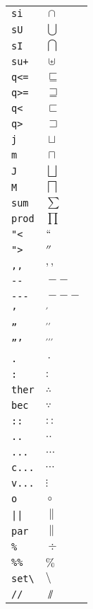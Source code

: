\begin{longtable}{ll}
\texttt{si}&${}\cap {}$\\
\texttt{sU}&${}\bigcup {}$\\
\texttt{sI}&${}\bigcap {}$\\
\texttt{su+}&${}\uplus {}$\\
\texttt{q<=}&${}\sqsubseteq {}$\\
\texttt{q>=}&${}\sqsupseteq {}$\\
\texttt{q<}&${}\sqsubset {}$\\
\texttt{q>}&${}\sqsupset {}$\\
\texttt{j}&${}\sqcup {}$\\
\texttt{m}&${}\sqcap {}$\\
\texttt{J}&${}\bigsqcup {}$\\
\texttt{M}&${}\bigsqcap {}$\\
\texttt{sum}&${}\sum {}$\\
\texttt{prod}&${}\prod {}$\\
\texttt{"<}&${}``{}$\\
\texttt{">}&${}''{}$\\
\texttt{,,}&${},\!\!, {}$\\
\texttt{{-}{-}}&${}--{}$\\
\texttt{{-}{-}{-}}&${}---{}$\\
\texttt{'}&${}^{\prime} {}$\\
\texttt{''}&${}^{\prime\prime} {}$\\
\texttt{'''}&${}^{\prime\prime\prime} {}$\\
\texttt{.}&${}\cdotp {}$\\
\texttt{:}&${}: {}$\\
\texttt{ther}&${}\therefore {}$\\
\texttt{bec}&${}\because {}$\\
\texttt{::}&${}:: {}$\\
\texttt{..}&${}.. {}$\\
\texttt{...}&${}\ldots {}$\\
\texttt{c...}&${}\cdots {}$\\
\texttt{v...}&${}\vdots {}$\\
\texttt{o}&${}\circ {}$\\
\texttt{||}&${}\| {}$\\
\texttt{par}&${}\parallel {}$\\
\texttt{\%}&${}\div {}$\\
\texttt{\%\%}&${}\% {}$\\
\texttt{set\textbackslash }&${}\setminus {}$\\
\texttt{//}&${}\sslash {}$\\

\end{longtable}
